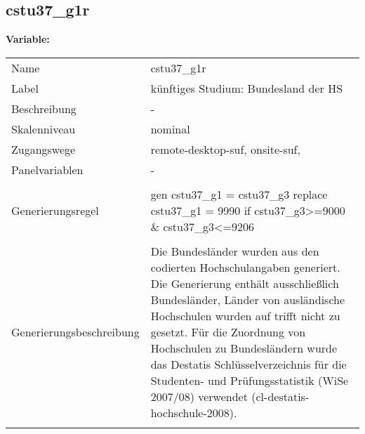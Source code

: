 	
	
	\subsection{cstu37\_g1r}
	\label{subSection:cstu37_g1r}

	\noindent\textbf{Variable:}\\
		\begin{tabular}{lL{11.3cm}}
			\label{tableVariable:cstu37_g1r}
			Name & cstu37\_g1r \\
			Label & künftiges Studium: Bundesland der HS \\
			Beschreibung & - \\
			Skalenniveau & nominal \\
			Zugangswege &
				remote-desktop-suf,
				onsite-suf,
 \\
			Panelvariablen & -
			 \\
			 \\
					Generierungsregel & gen cstu37\_g1 = cstu37\_g3
replace cstu37\_g1  = 9990 if cstu37\_g3\textgreater{}=9000 \& cstu37\_g3\textless{}=9206 \\
				 \\
					Generierungsbeschreibung & Die Bundesländer wurden aus den codierten Hochschulangaben generiert. Die Generierung enthält ausschließlich Bundesländer, Länder von ausländische Hochschulen wurden auf trifft nicht zu gesetzt. Für die Zuordnung von Hochschulen zu Bundesländern wurde das Destatis Schlüsselverzeichnis für die Studenten- und Prüfungsstatistik (WiSe 2007/08) verwendet (cl-destatis-hochschule-2008).
				 \\	
			 \\
		\end{tabular}






